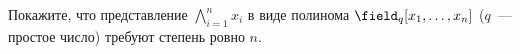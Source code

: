 Покажите, что представление $\bigwedge\limits_{i = 1}^{n} x_i$ в виде полинома $\field_q[x_1, \dots,
x_n]$ ($q$~--- простое число) требуют степень ровно $n$.